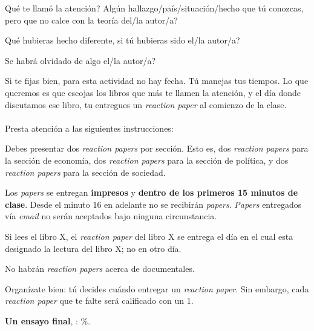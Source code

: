 \documentclass[letterpaper]{article}
\renewenvironment{itemize}{
  \begin{list}{}{
    \setlength{\leftmargin}{1.5em}
  }
}{
  \end{list}
}
\begin{document}
\begin{enumerate}
	\begin{itemize}
		\item[$\bullet$] Qu\'e te llam\'o la atenci\'on? Alg\'un hallazgo/pa\'is/situaci\'on/hecho que t\'u conozcas, pero que no calce con la teor\'ia del/la autor/a?
		\item[$\bullet$] Qu\'e hubieras hecho diferente, si t\'u hubieras sido el/la autor/a?
		\item[$\bullet$] Se habr\'a olvidado de algo el/la autor/a?
	\end{itemize}

	Si te fijas bien, para esta actividad no hay fecha. T\'u manejas tus tiempos. Lo que queremos es que escojas los libros que m\'as te llamen la atenci\'on, y el d\'ia donde discutamos ese libro, tu entregues un \emph{reaction paper} al comienzo de la clase. 
\\
\\
	Presta atenci\'on a las siguientes instrucciones:

	\begin{itemize}
		\item[$\bullet$] Debes presentar dos \emph{reaction papers} por secci\'on. Esto es, dos \emph{reaction papers} para la secci\'on de econom\'ia, dos \emph{reaction papers} para la secci\'on de pol\'itica, y dos \emph{reaction papers} para la secci\'on de sociedad.
		\item[$\bullet$] Los \emph{papers} se entregan {\bf impresos} y {\bf dentro de los primeros 15 minutos de clase}. Desde el minuto 16 en adelante no se recibir\'an \emph{papers}. \emph{Papers} entregados v\'ia \emph{email} no ser\'an aceptados bajo ninguna circunstancia.
		\item[$\bullet$] Si lees el libro X, el \emph{reaction paper} del libro X se entrega el d\'ia en el cual esta designado la lectura del libro X; no en otro d\'ia.
		\item[$\bullet$] No habr\'an \emph{reaction papers} acerca de documentales.
		\item[$\bullet$] Organ\'izate bien: t\'u decides cu\'ando entregar un \emph{reaction paper}. Sin embargo, cada \emph{reaction paper} que te falte ser\'a calificado con un 1.
	\end{itemize}


%

	\item {\bf Un ensayo final}, {\unskip}: {\unskip}\%.\\



\end{enumerate}
\end{document}
